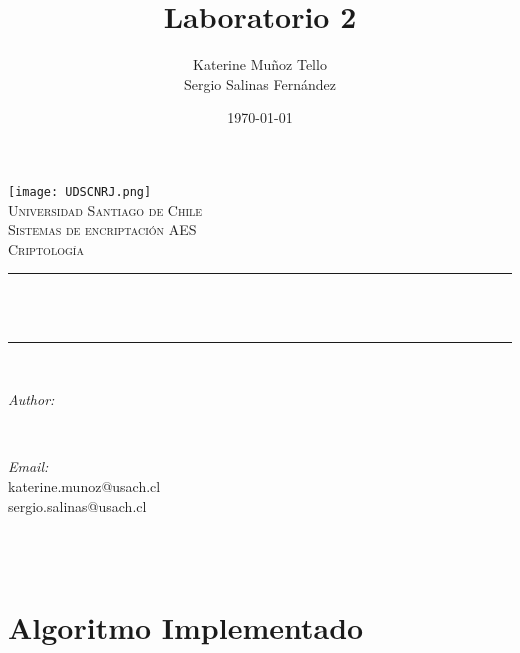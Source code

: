 \documentclass[12pt]{article}
\title{Laboratorio 2}								%
\author{Katerine Mu\~noz Tello \\
Sergio Salinas Fern\'andez}								%
\date{\today}											%
\makeatletter
\let\thetitle\@title
\let\theauthor\@author
\let\thedate\@date
\makeatother
\begin{document}

\begin{titlepage}
	\centering
    \vspace*{0.5 cm}
    \texttt{[image: UDSCNRJ.png]}\\[1.0 cm]	%
    \textsc{\LARGE Universidad Santiago de Chile}\\[2.0 cm]	%
	\textsc{\Large Sistemas de encriptaci\'on AES}\\[0.5 cm]				%
	\textsc{\large Criptolog\'ia}\\[0.5 cm]				%
	\rule{\linewidth}{0.2 mm} \\[0.4 cm]
	{ \huge \bfseries \thetitle}\\
	\rule{\linewidth}{0.2 mm} \\[1.5 cm]
	
	\begin{minipage}{0.4\textwidth}
		\begin{flushleft} \large
			\emph{Author:}\\
			\theauthor
			\end{flushleft}
			\end{minipage}~
			\begin{minipage}{0.4\textwidth}
			\begin{flushright} \large
			\emph{Email:} \\
			katerine.munoz@usach.cl \\
            sergio.salinas@usach.cl  %
		\end{flushright}
	\end{minipage}\\[2 cm]
	
	{\large \thedate}\\[2 cm]
 
	\vfill
	
\end{titlepage}


\tableofcontents
\pagebreak



\section{Algoritmo Implementado}
\end{document}
